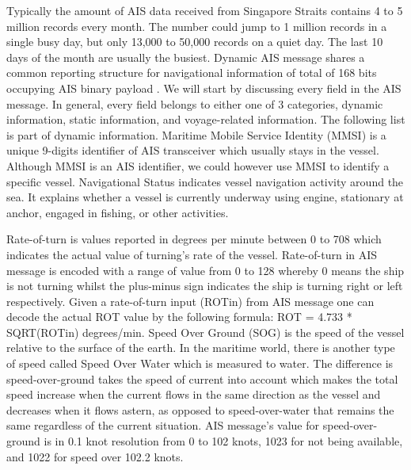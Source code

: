 Typically the amount of AIS data received from Singapore Straits contains 4 to 5 million records every month. The number could jump to 1 million records in a single busy day, but only 13,000 to 50,000 records on a quiet day. The last 10 days of the month are usually the busiest. Dynamic AIS message shares a common reporting structure for navigational information of total of 168 bits occupying AIS binary payload \cite{aivsprotocolraymond}. We will start by discussing every field in the AIS message. In general, every field belongs to either one of 3 categories, dynamic information, static information, and voyage-related information. The following list is part of dynamic information. Maritime Mobile Service Identity (MMSI) is a unique 9-digits identifier of AIS transceiver which usually stays in the vessel. Although MMSI is an AIS identifier, we could however use MMSI to identify a specific vessel. Navigational Status indicates vessel navigation activity around the sea. It explains whether a vessel is currently underway using engine, stationary at anchor, engaged in fishing, or other activities.

Rate-of-turn is values reported in degrees per minute between 0 to 708 which indicates the actual value of turning's rate of the vessel. Rate-of-turn in AIS message is encoded with a range of value from 0 to 128 whereby 0 means the ship is not turning whilst the plus-minus sign indicates the ship is turning right or left respectively. Given a rate-of-turn input (ROTin) from AIS message one can decode the actual ROT value by the following formula: ROT = 4.733 * SQRT(ROTin) degrees/min. Speed Over Ground (SOG) is the speed of the vessel relative to the surface of the earth. In the maritime world, there is another type of speed called Speed Over Water which is measured to water. The difference is speed-over-ground takes the speed of current into account which makes the total speed increase when the current flows in the same direction as the vessel and decreases when it flows astern, as opposed to speed-over-water that remains the same regardless of the current situation. AIS message's value for speed-over-ground is in 0.1 knot resolution from 0 to 102 knots, 1023 for not being available, and 1022 for speed over 102.2 knots.


